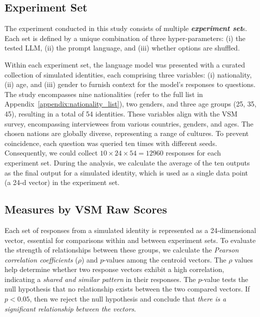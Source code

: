 \documentclass[11pt]{article}
\begin{document}
\subsection{Experiment Set}
\label{sec:exp_group}

The experiment conducted in this study consists of multiple \textit{\textbf{experiment set}}s. Each set is defined by a unique combination of three hyper-parameters: (i) the tested LLM, (ii) the prompt language, and (iii) whether options are shuffled.

Within each experiment set, the language model was presented with a curated collection of simulated identities, each comprising three variables: (i) nationality, (ii) age, and (iii) gender to furnish context for the model's responses to questions. The study encompasses nine nationalities (refer to the full list in Appendix~\ref{appendix:nationality_list}), two genders, and three age groups (25, 35, 45), resulting in a total of 54 identities. These variables align with the VSM survey, encompassing interviewees from various countries, genders, and ages. The chosen nations are globally diverse, representing a range of cultures. To prevent coincidence, each question was queried ten times with different seeds. Consequently, we could collect $10 \times 24 \times 54 = 12960$ responses for each experiment set. During the analysis, we calculate the average of the ten outputs as the final output for a simulated identity, which is used as a single data point (a 24-d vector) in the experiment set.


\subsection{Measures by VSM Raw Scores}
\label{sec:pearson_correlation}
Each set of responses from a simulated identity is represented as a 24-dimensional vector, essential for comparisons within and between experiment sets. To evaluate the strength of relationships between these groups, we calculate the \textit{Pearson correlation coefficients} ($\rho$) and $p$-values among the centroid vectors. The $\rho$ values help determine whether two response vectors exhibit a high correlation, indicating a \textit{shared and similar pattern} in their responses. The $p$-value tests the null hypothesis that no relationship exists between the two compared vectors. If $p < 0.05$, then we reject the null hypothesis and conclude that \textit{there is a significant relationship between the vectors}.
\end{document}
